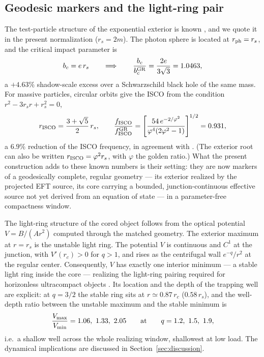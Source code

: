 \documentclass[12pt,a4paper]{article}
\begin{document}
\subsection{Geodesic markers and the light-ring pair}
\label{sec:geodesics}

The test-particle structure of the exponential exterior is known
\cite{Boonserm2018,MakukovMychelkin2018}, and we quote it in the present
normalization ($r_s=2m$). The photon sphere is located at $r_{\rm ph}=r_s$,
and the critical impact parameter is
\[
b_c=e\,r_s
\qquad\Longrightarrow\qquad
\frac{b_c}{b_c^{\rm GR}}=\frac{2e}{3\sqrt3}=1.0463,
\]
a $+4.63\%$ shadow-scale excess over a Schwarzschild black hole of the same
mass. For massive particles, circular orbits give the ISCO from the condition
$r^2-3r_sr+r_s^2=0$,
\[
r_{\rm ISCO}=\frac{3+\sqrt5}{2}\,r_s,
\qquad
\frac{f_{\rm ISCO}}{f_{\rm ISCO}^{\rm GR}}
=\left[\frac{54\,e^{-2/\varphi^2}}{\varphi^4(2\varphi^2-1)}\right]^{1/2}
=0.931,
\]
a $6.9\%$ reduction of the ISCO frequency, in agreement with
\cite{MakukovMychelkin2018}. (The exterior root can also be written
$r_{\rm ISCO}=\varphi^{2}r_s$, with $\varphi$ the golden ratio.) What the present
construction adds to these known numbers is their setting: they are now
markers of a geodesically complete, regular geometry --- its exterior realized
by the projected EFT source, its core carrying a bounded, junction-continuous
effective source not yet derived from an equation of state --- in a
parameter-free compactness window.

The light-ring structure of the cored object follows from the optical
potential $V=B/(Ar^2)$ computed through the matched geometry. The exterior
maximum at $r=r_s$ is the unstable light ring. The potential $V$ is
continuous and $C^1$ at the junction, with $V'(r_c)>0$ for $q>1$, and rises
as the centrifugal wall $e^{-q}/r^2$ at the regular center. Consequently,
$V$ has exactly one interior minimum --- a stable light ring inside the core
--- realizing the light-ring pairing required for horizonless ultracompact
objects \cite{CunhaBertiHerdeiro2017}. Its location and the depth of the trapping
well are explicit: at $q=3/2$ the stable ring sits at $r\simeq0.87\,r_c$
($0.58\,r_s$), and the well-depth ratio between the unstable maximum and the
stable minimum is
\[
\frac{V_{\rm max}}{V_{\rm min}}
=1.06,\ 1.33,\ 2.05
\qquad\text{at}\qquad
q=1.2,\ 1.5,\ 1.9,
\]
i.e.\ a shallow well across the whole realizing window, shallowest at low
load. The dynamical implications are discussed in
Section~\ref{sec:discussion}.
\end{document}
